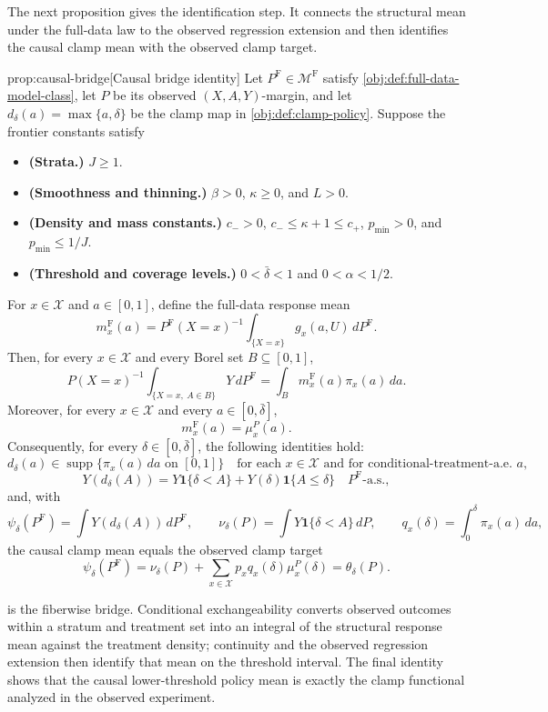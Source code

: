 \documentclass[11pt]{article}
\begin{document}
The next proposition gives the identification step. It connects the structural mean under the full-data law to the observed regression extension and then identifies the causal clamp mean with the observed clamp target.

\begin{propositionv}{prop:causal-bridge}[Causal bridge identity]
Let \(P^{\mathrm F}\in\mathcal M^{\mathrm F}\) satisfy \cref{obj:def:full-data-model-class}, let \(P\) be its observed \((X,A,Y)\)-margin, and let \(d_\delta(a)=\max\{a,\delta\}\) be the clamp map in \cref{obj:def:clamp-policy}.  Suppose the frontier constants satisfy
\begin{itemize}
\item \textbf{(Strata.)} \(J\geq 1\).
\item \textbf{(Smoothness and thinning.)} \(\beta>0\), \(\kappa\geq 0\), and \(L>0\).
\item \textbf{(Density and mass constants.)} \(c_->0\), \(c_-\leq \kappa+1\leq c_+\), \(p_{\min}>0\), and \(p_{\min}\leq 1/J\).
\item \textbf{(Threshold and coverage levels.)} \(0<\bar\delta<1\) and \(0<\alpha<1/2\).
\end{itemize}
For \(x\in\mathcal X\) and \(a\in[0,1]\), define the full-data response mean
\[
m_x^{\mathrm F}(a)
=
P^{\mathrm F}(X=x)^{-1}
\int_{\{X=x\}} g_x(a,U)\,dP^{\mathrm F}.
\]
Then, for every \(x\in\mathcal X\) and every Borel set \(B\subseteq[0,1]\),
\[
P(X=x)^{-1}
\int_{\{X=x,\ A\in B\}} Y\,dP^{\mathrm F}
=
\int_B m_x^{\mathrm F}(a)\pi_x(a)\,da.
\]
Moreover, for every \(x\in\mathcal X\) and every \(a\in[0,\bar\delta]\),
\[
m_x^{\mathrm F}(a)=\mu_x^P(a).
\]
Consequently, for every \(\delta\in[0,\bar\delta]\), the following identities hold:
\[
d_\delta(a)\in \operatorname{supp}\{\pi_x(a)\,da\text{ on }[0,1]\}
\quad
\text{for each }x\in\mathcal X\text{ and for conditional-treatment-a.e. }a,
\]
\[
Y(d_\delta(A))
=
Y\mathbf 1\{\delta<A\}+Y(\delta)\mathbf 1\{A\leq\delta\}
\quad P^{\mathrm F}\text{-a.s.},
\]
and, with
\[
\psi_\delta(P^{\mathrm F})=\int Y(d_\delta(A))\,dP^{\mathrm F},
\qquad
\nu_\delta(P)=\int Y\mathbf 1\{\delta<A\}\,dP,
\qquad
q_x(\delta)=\int_0^\delta \pi_x(a)\,da,
\]
the causal clamp mean equals the observed clamp target
\[
\psi_\delta(P^{\mathrm F})
=
\nu_\delta(P)+\sum_{x\in\mathcal X}p_xq_x(\delta)\mu_x^P(\delta)
=
\theta_\delta(P).
\]
\end{propositionv}

 is the fiberwise bridge. Conditional exchangeability converts observed outcomes within a stratum and treatment set into an integral of the structural response mean against the treatment density; continuity and the observed regression extension then identify that mean on the threshold interval. The final identity shows that the causal lower-threshold policy mean is exactly the clamp functional analyzed in the observed experiment.
\end{document}
